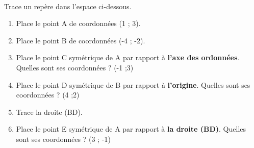 \documentclass[a4paper,11pt]{article}
\newcommand{\myarrow}{-{Latex[length=3mm, width=2mm]}}
\begin{document}
\begin{question}[(7 points)]\

	Trace un repère dans l'espace ci-dessous.

	\begin{center}
	\end{center}

	\begin{enumerate}[1)]
		\item Place le point A de coordonnées (1 ; 3).
		\item Place le point B de coordonnées (-4 ; -2).
		\item Place le point C symétrique de A par rapport à \textbf{l'axe des ordonnées}. Quelles sont ses coordonnées ? {\color{red} (-1 ;3)}
		\item Place le point D symétrique de B par rapport à \textbf{l'origine}. Quelles sont ses coordonnées ? {\color{red} (4 ;2)}
		\item Trace la droite (BD).
		\item Place le point E symétrique de A par rapport à \textbf{la droite (BD)}.  Quelles sont ses coordonnées ? {\color{red} (3 ; -1)}
	\end{enumerate}
\end{question}
\end{document}
